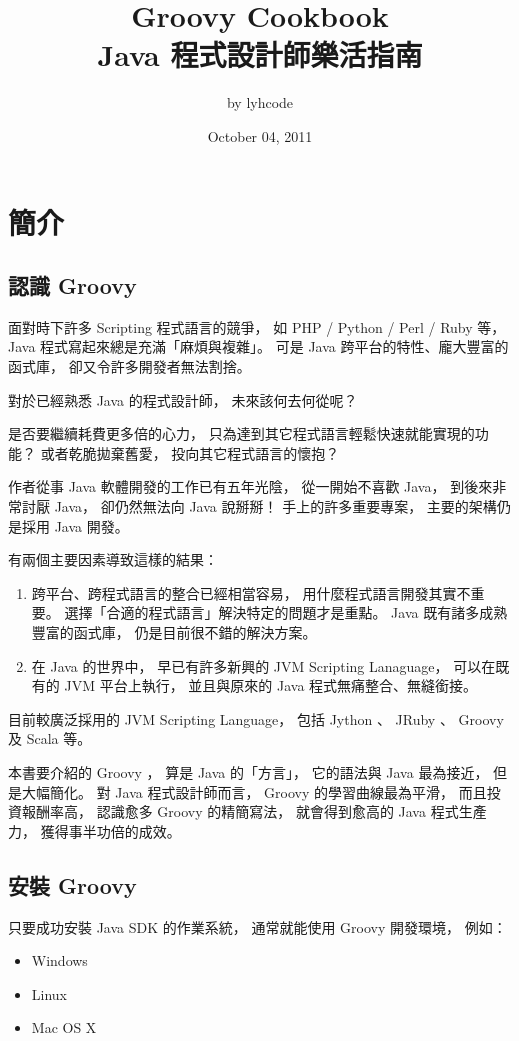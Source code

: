 \documentclass[a4paper,12pt,english]{sphinxmanual}
\title{Groovy Cookbook\\Java 程式設計師樂活指南}
\date{October 04, 2011}
\author{by lyhcode}
\begin{document}
\maketitle
\tableofcontents
{}\label{index::doc}



\chapter{簡介}
\label{intro:groovy-cookbook}\label{intro::doc}\label{intro:id1}

\section{認識 Groovy}
\label{intro:groovy}
面對時下許多 Scripting 程式語言的競爭，
如 PHP / Python / Perl / Ruby 等，
Java 程式寫起來總是充滿「麻煩與複雜」。
可是 Java 跨平台的特性、龐大豐富的函式庫，
卻又令許多開發者無法割捨。

對於已經熟悉 Java 的程式設計師，
未來該何去何從呢？

是否要繼續耗費更多倍的心力，
只為達到其它程式語言輕鬆快速就能實現的功能？
或者乾脆拋棄舊愛，
投向其它程式語言的懷抱？

作者從事 Java 軟體開發的工作已有五年光陰，
從一開始不喜歡 Java，
到後來非常討厭 Java，
卻仍然無法向 Java 說掰掰！
手上的許多重要專案，
主要的架構仍是採用 Java 開發。

有兩個主要因素導致這樣的結果：
\begin{enumerate}
\item {} 
跨平台、跨程式語言的整合已經相當容易，
用什麼程式語言開發其實不重要。
選擇「合適的程式語言」解決特定的問題才是重點。
Java 既有諸多成熟豐富的函式庫，
仍是目前很不錯的解決方案。

\item {} 
在 Java 的世界中，
早已有許多新興的 JVM Scripting Lanaguage，
可以在既有的 JVM 平台上執行，
並且與原來的 Java 程式無痛整合、無縫銜接。

\end{enumerate}

目前較廣泛採用的 JVM Scripting Language，
包括 Jython 、 JRuby 、 Groovy 及 Scala 等。

本書要介紹的 Groovy ，
算是 Java 的「方言」，
它的語法與 Java 最為接近，
但是大幅簡化。
對 Java 程式設計師而言，
Groovy 的學習曲線最為平滑，
而且投資報酬率高，
認識愈多 Groovy 的精簡寫法，
就會得到愈高的 Java 程式生產力，
獲得事半功倍的成效。


\section{安裝 Groovy}
\label{intro:id2}
只要成功安裝 Java SDK 的作業系統，
通常就能使用 Groovy 開發環境，
例如：
\begin{itemize}
\item {} 
Windows

\item {} 
Linux

\item {} 
Mac OS X

\end{itemize}
\end{document}
